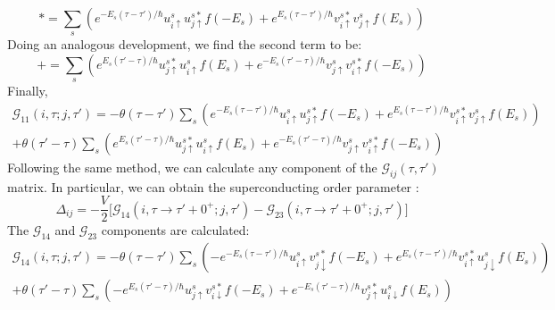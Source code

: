 \documentclass[letterpaper,12pt]{article}
\begin{document}
\begin{equation*}
    * = \sum_{s} (e^{-E_s(\tau - \tau')/\hbar} u_{i\uparrow}^su_{j\uparrow}^{s*}f(-E_s) + e^{E_s(\tau - \tau')/\hbar}v_{i\uparrow}^{s*}v_{j\uparrow}^{s}f(E_s))
\end{equation*}
Doing an analogous development, we find the second term to be:
\begin{equation*}
    + = \sum_{s} (e^{E_s(\tau' - \tau)/\hbar} u_{j\uparrow}^{s*}u_{i\uparrow}^{s}f(E_s) + e^{-E_s(\tau' - \tau)/\hbar}v_{j\uparrow}^{s}v_{i\uparrow}^{s*}f(-E_s))
\end{equation*}
Finally,
\begin{equation}
\begin{split}
    \mathcal{G}_{11}(i, \tau; j, \tau') = - \theta(\tau - \tau')\sum_{s} (e^{-E_s(\tau - \tau')/\hbar} u_{i\uparrow}^s u_{j\uparrow}^{s*}f(-E_s) + e^{E_s(\tau - \tau')/\hbar}v_{i\uparrow}^{s*}v_{j\uparrow}^{s}f(E_s))\\
    + \theta(\tau' - \tau)\sum_{s} (e^{E_s(\tau' - \tau)/\hbar} u_{j\uparrow}^{s*}u_{i\uparrow}^{s}f(E_s) + e^{-E_s(\tau' - \tau)/\hbar}v_{j\uparrow}^{s}v_{i\uparrow}^{s*}f(-E_s))
\end{split}
\end{equation}
Following the same method, we can calculate any component of the $\mathcal{G}_{ij}(\tau, \tau')$ matrix. In particular, we can obtain the superconducting order parameter \cite{book}:
\begin{equation}
    \Delta_{ij} = - \frac{V}{2} \big[\mathcal{G}_{14}(i, \tau \rightarrow \tau'+0^+; j, \tau') - \mathcal{G}_{23}(i, \tau \rightarrow \tau'+0^+; j, \tau')\big]
    \label{gap}
\end{equation}
The $\mathcal{G}_{14}$ and $\mathcal{G}_{23}$ components are calculated:
\begin{equation}
\begin{split}
    \mathcal{G}_{14}(i, \tau; j, \tau') = - \theta(\tau - \tau')\sum_{s} (- e^{-E_s(\tau - \tau')/\hbar} u_{i\uparrow}^s v_{j\downarrow}^{s*}f(-E_s) + e^{E_s(\tau - \tau')/\hbar}v_{i\uparrow}^{s*}u_{j\downarrow}^{s}f(E_s))\\
    + \theta(\tau' - \tau)\sum_{s} (-e^{E_s(\tau' - \tau)/\hbar} u_{j\uparrow}^{s}v_{i\downarrow}^{s*}f(-E_s) + e^{-E_s(\tau' - \tau)/\hbar}v_{j\uparrow}^{s*}u_{i\downarrow}^{s}f(E_s))
\end{split}
\end{equation}
\end{document}
